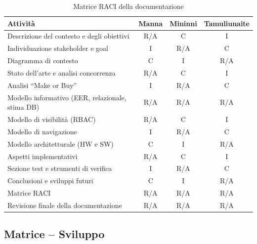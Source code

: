 \begin{table}[H]
\centering
\renewcommand{\arraystretch}{1.25}
\footnotesize
\begin{tabularx}{\textwidth}{|X|c|c|c|}
\hline
\textbf{Attivit\`a} & \textbf{Manna} & \textbf{Mininni} & \textbf{Tamuliunaite} \\
\hline
Descrizione del contesto e degli obiettivi & R/A & C & I \\
\hline
Individuazione stakeholder e goal & I & R/A & C \\
\hline
Diagramma di contesto & C & I & R/A \\
\hline
Stato dell'arte e analisi concorrenza & R/A & C & I \\
\hline
Analisi ``Make or Buy'' & I & R/A & C \\
\hline
Modello informativo (EER, relazionale, stima DB) & R/A & R/A & R/A \\
\hline
Modello di visibilit\`a (RBAC) & R/A & C & I \\
\hline
Modello di navigazione & I & R/A & C \\
\hline
Modello architetturale (HW e SW) & C & I & R/A \\
\hline
Aspetti implementativi & R/A & C & I \\
\hline
Sezione test e strumenti di verifica & I & R/A & C \\
\hline
Conclusioni e sviluppi futuri & C & I & R/A \\
\hline
Matrice RACI & R/A & R/A & R/A \\
\hline
Revisione finale della documentazione & R/A & R/A & R/A \\
\hline
\end{tabularx}
\caption{Matrice RACI della documentazione}
\label{tab:raci-documentazione}
\end{table}

\subsection{Matrice -- Sviluppo}

